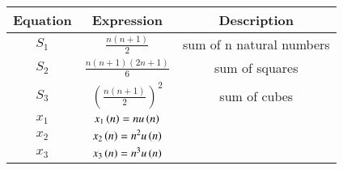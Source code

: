 \begin{tabular}{|c|c|c|}
    \hline
    \textbf{Equation} & \textbf{Expression} & \textbf{Description} \\
    \hline
    \(S_1\) & \(\frac{n(n+1)}{2}\) & sum of n natural numbers\\
    \hline
    \(S_2\) & \(\frac{n(n+1)(2n+1)}{6}\) & sum of squares\\
    \hline
    \(S_3\) & \(\left(\frac{n(n+1)}{2}\right)^2\) & sum of cubes \\
    \hline
    \(x_1\) & \(x_1\left( n \right) = n u\left( n \right)\) & \\
    \hline
    \(x_2\) & \(x_2\left( n \right) = n^2 u\left( n \right)\) &  \\
    \hline
    \(x_3\) & \(x_3\left( n \right) = n^3 u\left( n \right)\) & \\
    \hline
\end{tabular}


